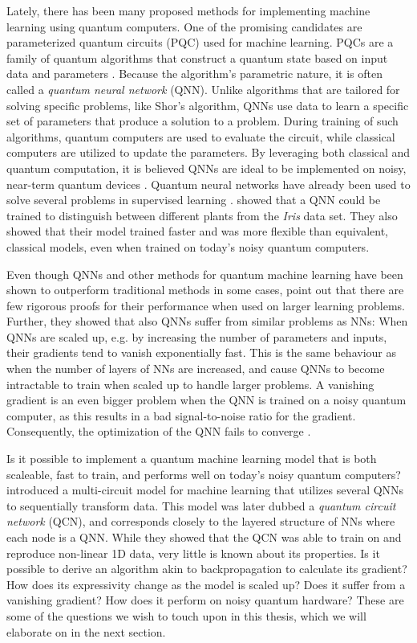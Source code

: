 Lately, there has been many proposed methods for implementing machine learning using quantum computers. One of the promising candidates are parameterized quantum circuits (PQC) used for machine learning. PQCs are a family of quantum algorithms that construct a quantum state based on input data and parameters \citet{Benedetti_2019}. Because the algorithm's parametric nature, it is often called a \emph{quantum neural network} (QNN). Unlike algorithms that are tailored for solving specific problems, like Shor's algorithm, QNNs use data to learn a specific set of parameters that produce a solution to a problem. During training of such algorithms, quantum computers are used to evaluate the circuit, while classical computers are utilized to update the parameters. By leveraging both classical and quantum computation, it is believed QNNs are ideal to be implemented on noisy, near-term quantum devices \citet{Cerezo_2021}. Quantum neural networks have already been used to solve several problems in supervised learning \cite{Benedetti_2019, abbas2020power, lloyd2018quantum}. \citet{abbas2020power} showed that a QNN could be trained to distinguish between different plants from the \emph{Iris} data set. They also showed that their model trained faster and was more flexible than equivalent, classical models, even when trained on today's noisy quantum computers.

Even though QNNs and other methods for quantum machine learning have been shown to outperform traditional methods in some cases, \citet{McClean_2018} point out that there are few rigorous proofs for their performance when used on larger learning problems. Further, they showed that also QNNs suffer from similar problems as NNs: When QNNs are scaled up, e.g. by increasing the number of parameters and inputs, their gradients tend to vanish exponentially fast. This is the same behaviour as when the number of layers of NNs are increased, and cause QNNs to become intractable to train when scaled up to handle larger problems. A vanishing gradient is an even bigger problem when the QNN is trained on a noisy quantum computer, as this results in a bad signal-to-noise ratio for the gradient. Consequently, the optimization of the QNN fails to converge \cite{skolik2020layerwise}.

Is it possible to implement a quantum machine learning model that is both scaleable, fast to train, and performs well on today's noisy quantum computers? \citet{stian} introduced a multi-circuit model for machine learning that utilizes several QNNs to sequentially transform data. This model was later dubbed a \emph{quantum circuit network} (QCN), and corresponds closely to the layered structure of NNs where each node is a QNN. While they showed that the QCN was able to train on and reproduce non-linear 1D data, very little is known about its properties. Is it possible to derive an algorithm akin to backpropagation to calculate its gradient? How does its expressivity change as the model is scaled up? Does it suffer from a vanishing gradient? How does it perform on noisy quantum hardware? These are some of the questions we wish to touch upon in this thesis, which we will elaborate on in the next section.


